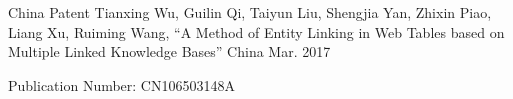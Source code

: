 

\begin{cventries}

  \cventry
    {China Patent} %
    {Tianxing Wu, Guilin Qi, Taiyun Liu, Shengjia Yan, Zhixin Piao, Liang Xu, Ruiming Wang, ``A Method of Entity Linking in Web Tables based on Multiple Linked Knowledge Bases''} %
    {China} %
    {Mar. 2017} %
    {
    	\begin{cvitems} %
        	\item {Publication Number: CN106503148A}
      \end{cvitems}
    }

\end{cventries}
